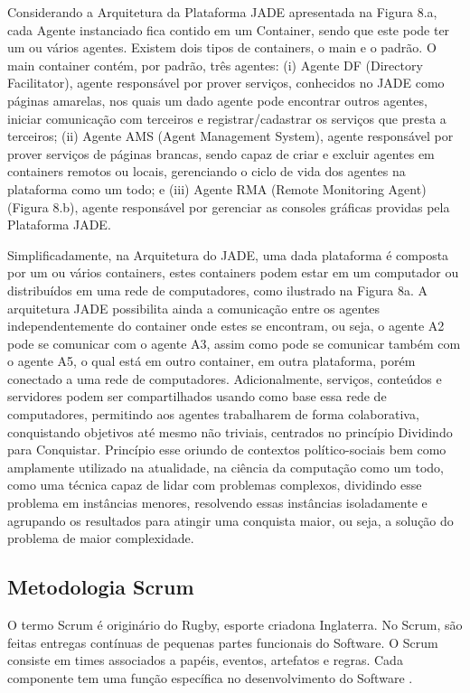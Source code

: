 Considerando a Arquitetura da Plataforma JADE apresentada na Figura 8.a, cada Agente instanciado fica contido em um Container, sendo que este pode ter um ou vários agentes. Existem dois tipos de containers, o main e o padrão. O main container contém, por padrão, três agentes: (i) Agente DF (Directory Facilitator), agente responsável por prover serviços, conhecidos no JADE como páginas amarelas, nos quais um dado agente pode encontrar outros agentes, iniciar comunicação com terceiros e registrar/cadastrar os serviços que presta a terceiros; (ii) Agente AMS (Agent Management System), agente responsável por prover serviços de páginas brancas, sendo capaz de criar e excluir agentes em containers remotos ou locais, gerenciando o ciclo de vida dos agentes na plataforma como um todo; e (iii) Agente RMA (Remote Monitoring Agent) (Figura 8.b), agente responsável por gerenciar as consoles gráficas providas pela Plataforma JADE.

Simplificadamente, na Arquitetura do JADE, uma dada plataforma é composta por um ou vários containers, estes containers podem estar em um computador ou distribuídos em uma rede de computadores, como ilustrado na Figura 8a. A arquitetura JADE possibilita ainda a comunicação entre os agentes independentemente do container onde estes se encontram, ou seja, o agente A2 pode se comunicar com o agente A3, assim como pode se comunicar também com o agente A5, o qual está em outro container, em outra plataforma, porém conectado a uma rede de computadores. Adicionalmente, serviços, conteúdos e servidores podem ser compartilhados usando como base essa rede de computadores, permitindo aos agentes trabalharem de forma colaborativa, conquistando objetivos até mesmo não triviais, centrados no princípio Dividindo para Conquistar. Princípio esse oriundo de contextos político-sociais bem como amplamente utilizado na atualidade, na ciência da computação como um todo, como uma técnica capaz de lidar com problemas complexos, dividindo esse problema em instâncias menores, resolvendo essas instâncias isoladamente e agrupando os resultados para atingir uma conquista maior, ou seja, a solução do problema de maior complexidade.


\subsection{Metodologia Scrum}

O termo Scrum  é originário do Rugby, esporte criadona Inglaterra. No Scrum, são feitas entregas contínuas de pequenas partes funcionais do Software. O Scrum consiste em times associados a papéis, eventos, artefatos e regras. Cada componente tem uma função específica no desenvolvimento do Software \cite{schwaber2013}.

